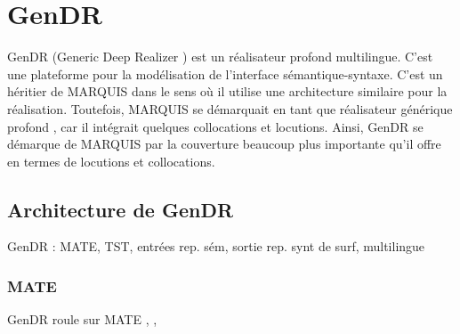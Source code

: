 
\chapter{GenDR}\label{chapgendr}

GenDR (Generic Deep Realizer \citep{lareau18}) est un réalisateur profond multilingue. C'est une plateforme pour la modélisation de l'interface sémantique-syntaxe. C'est un héritier de MARQUIS dans le sens où il utilise une architecture similaire pour la réalisation. Toutefois, MARQUIS se démarquait en tant que réalisateur générique profond \citep{LambreyImplementationcollocationspour2017},\citep{lareau18}  car il intégrait quelques collocations et locutions. Ainsi, GenDR se démarque de MARQUIS par la couverture beaucoup plus importante qu'il offre en termes de locutions et collocations.

\section{Architecture de GenDR}

GenDR : MATE, TST, entrées rep. sém, sortie rep. synt de surf, multilingue

\subsection{MATE}

GenDR roule sur MATE \citep{BohnetDevelopmentEnvironmentMTTbased2000}, \citep{BohnetOpensourcegraph2010},\citep{Lareau2007TowardsAG}

